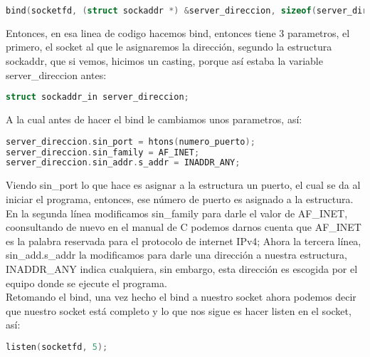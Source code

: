 \documentclass{article}
\begin{document}
\begin{lstlisting}[language=C]
bind(socketfd, (struct sockaddr *) &server_direccion, sizeof(server_direccion))
\end{lstlisting}


Entonces, en esa linea de codigo hacemos bind, entonces tiene 3 parametros, el primero, el socket al que le asignaremos la dirección, segundo la estructura sockaddr, que si vemos, hicimos un casting, porque así estaba la variable server\_direccion antes:


\begin{lstlisting}[language=C]
struct sockaddr_in server_direccion;
\end{lstlisting}


A la cual antes de hacer el bind le cambiamos unos parametros, así:


\begin{lstlisting}[language=C]
server_direccion.sin_port = htons(numero_puerto);
server_direccion.sin_family = AF_INET;
server_direccion.sin_addr.s_addr = INADDR_ANY;
\end{lstlisting}


Viendo sin\_port lo que hace es asignar a la estructura un puerto, el cual se da al iniciar el programa, entonces, ese número de puerto es asignado a la estructura. En la segunda línea modificamos sin\_family para darle el valor de AF\_INET, coonsultando de nuevo en el manual de C podemos darnos cuenta que AF\_INET\cite{man7ip} es la palabra reservada para el protocolo de internet IPv4; Ahora la tercera línea, sin\_add.s\_addr la modificamos para darle una dirección a nuestra estructura, INADDR\_ANY indica cualquiera, sin embargo, esta dirección es escogida por el equipo donde se ejecute el programa.\\ 
Retomando el bind, una vez hecho el bind a nuestro socket ahora podemos decir que nuestro socket está completo y lo que nos sigue es hacer listen en el socket, así:


\begin{lstlisting}[language=C]
listen(socketfd, 5);
\end{lstlisting}
\end{document}
